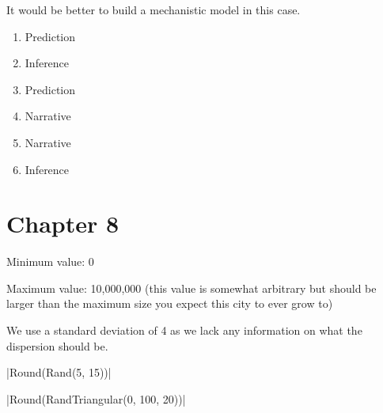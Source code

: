 \documentclass[]{memoir}
\newcommand{\DecValTok}[1]{\textcolor[rgb]{0.25,0.63,0.44}{{#1}}}
\newcommand{\FunctionTok}[1]{\textcolor[rgb]{0.02,0.16,0.49}{{#1}}}
\newcommand{\NormalTok}[1]{{#1}}
\begin{document}
It would be better to build a mechanistic model in this case.


\begin{enumerate}
\def\labelenumi{\arabic{enumi}.}
\itemsep1pt\parskip0pt
\item
  Prediction
\item
  Inference
\item
  Prediction
\item
  Narrative
\item
  Narrative
\item
  Inference
\end{enumerate}

\section{Chapter 8}


Minimum value: 0

Maximum value: 10,000,000 (this value is somewhat arbitrary but should
be larger than the maximum size you expect this city to ever grow to)


We use a standard deviation of 4 as we lack any information on what the
dispersion should be.

|\FunctionTok{Round}\NormalTok{(}\FunctionTok{Rand}\NormalTok{(}\DecValTok{5}\NormalTok{, }\DecValTok{15}\NormalTok{))}|


|\FunctionTok{Round}\NormalTok{(}\FunctionTok{RandTriangular}\NormalTok{(}\DecValTok{0}\NormalTok{, }\DecValTok{100}\NormalTok{, }\DecValTok{20}\NormalTok{))}|
\end{document}
